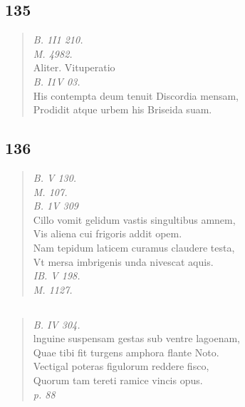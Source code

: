\documentclass[11pt, a4paper]{report}
\begin{document}
            \subsection*{135}
      \begin{verse}
      \textit{B. 1I1 210.} \\ \textit{M. 4982.} \\ Aliter. Vituperatio \\ \textit{B. I1V 03.} \\ His contempta deum tenuit Discordia mensam, \\ Prodidit atque urbem his Briseida suam. \\ 
      \end{verse}
  
            \subsection*{136}
      \begin{verse}
      \textit{B. V 130.} \\ \textit{M. 107.} \\ \textit{B. 1V 309} \\ Cillo vomit gelidum vastis singultibus amnem, \\ Vis aliena cui frigoris addit opem. \\ Nam tepidum laticem curamus claudere testa, \\ Vt mersa imbrigenis unda nivescat aquis. \\ \textit{IB. V 198.} \\ \textit{M. 1127.} \\ 
      \end{verse}
  
            \subsection*{}
      \begin{verse}
      \textit{B. IV 304.} \\ lnguine suspensam gestas  \lbrack sub ventre \rbrack  lagoenam, \\ Quae tibi fit turgens amphora flante Noto. \\ Vectigal poteras figulorum reddere fisco, \\ Quorum tam tereti ramice vincis opus. \\ \textit{p. 88} \\ 
      \end{verse}
  
\end{document}
